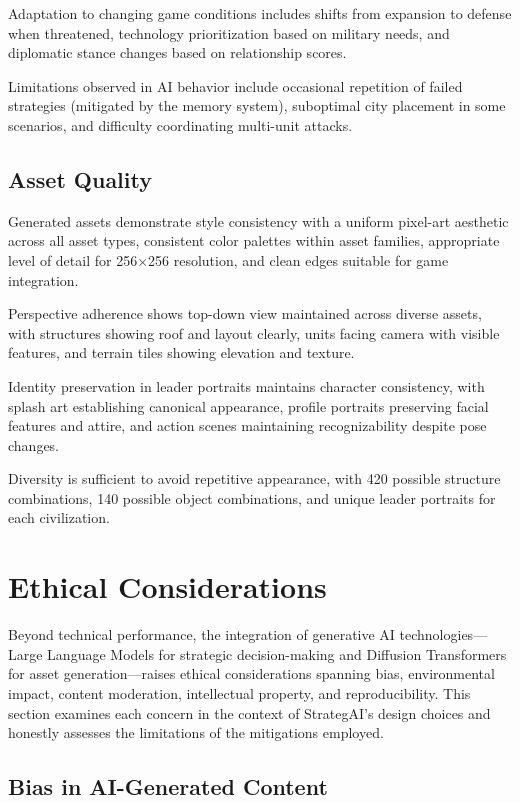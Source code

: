 \documentclass[conference]{IEEEtran}
\begin{document}
Adaptation to changing game conditions includes shifts from expansion to defense when threatened, technology prioritization based on military needs, and diplomatic stance changes based on relationship scores.

Limitations observed in AI behavior include occasional repetition of failed strategies (mitigated by the memory system), suboptimal city placement in some scenarios, and difficulty coordinating multi-unit attacks.

\subsection{Asset Quality}

Generated assets demonstrate style consistency with a uniform pixel-art aesthetic across all asset types, consistent color palettes within asset families, appropriate level of detail for 256$\times$256 resolution, and clean edges suitable for game integration.

Perspective adherence shows top-down view maintained across diverse assets, with structures showing roof and layout clearly, units facing camera with visible features, and terrain tiles showing elevation and texture.

Identity preservation in leader portraits maintains character consistency, with splash art establishing canonical appearance, profile portraits preserving facial features and attire, and action scenes maintaining recognizability despite pose changes.

Diversity is sufficient to avoid repetitive appearance, with 420 possible structure combinations, 140 possible object combinations, and unique leader portraits for each civilization.

\section{Ethical Considerations}
\label{sec:ethics}

Beyond technical performance, the integration of generative AI technologies---Large Language Models for strategic decision-making and Diffusion Transformers for asset generation---raises ethical considerations spanning bias, environmental impact, content moderation, intellectual property, and reproducibility. This section examines each concern in the context of StrategAI's design choices and honestly assesses the limitations of the mitigations employed.

\subsection{Bias in AI-Generated Content}
\end{document}

